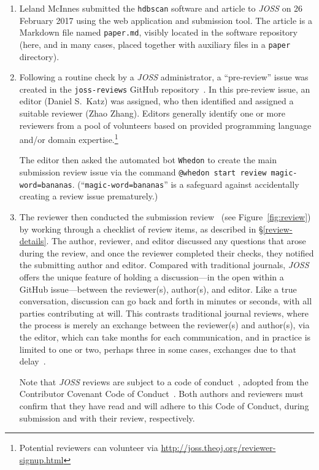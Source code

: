 \documentclass{article}
\newcommand\joss{\textit{JOSS}}
\begin{document}
\begin{enumerate}
\item Leland McInnes submitted the \texttt{hdbscan} software and article to \joss{} on 26 February 2017 using the web application and submission tool.
The article is a Markdown file named \texttt{paper.md}, visibly located in the software repository (here, and in many cases, placed together with auxiliary files in a \texttt{paper} directory).

\item Following a routine check by a \joss{} administrator, a ``pre-review'' issue was created in the \texttt{joss-reviews} GitHub repository~\cite{hdbscan-joss-pre-review}. In this pre-review issue, an editor (Daniel S.~Katz) was assigned, who then identified and assigned a suitable reviewer (Zhao Zhang).
Editors generally identify one or more reviewers from a pool of volunteers based on provided programming language and\slash or domain expertise.\footnote{Potential reviewers can volunteer via \url{http://joss.theoj.org/reviewer-signup.html}}

The editor then asked the automated bot \texttt{Whedon} to create the main submission review issue via the command \texttt{@whedon start review magic-word=bananas}. (``\texttt{magic-word=bananas}'' is a safeguard against accidentally creating a review issue prematurely.)

\item The reviewer then conducted the submission review~\cite{hdbscan-joss-review} (see Figure~\ref{fig:review}) by working through a checklist of review items, as described in \S\ref{review-details}. The author, reviewer, and editor discussed any questions that arose during the review, and once the reviewer completed their checks, they notified the submitting author and editor.
Compared with traditional journals, \joss{} offers the unique feature of holding a discussion---in the open within a GitHub issue---between the reviewer(s), author(s), and editor.
Like a true conversation, discussion can go back and forth in minutes or seconds, with all parties contributing at will. This contrasts traditional journal reviews, where the process is merely an exchange between the reviewer(s) and author(s), via the editor, which can take months for each communication, and in practice is limited to one or two, perhaps three in some cases, exchanges due to that delay~\cite{tennant-peerreview}.

Note that \joss{} reviews are subject to a code of conduct~\cite{code-of-conduct}, adopted from the Contributor Covenant Code of Conduct~\cite{contributor-covenant-coc}.
Both authors and reviewers must confirm that they have read and will adhere to this Code of Conduct, during submission and with their review, respectively.


\end{enumerate}
\end{document}
